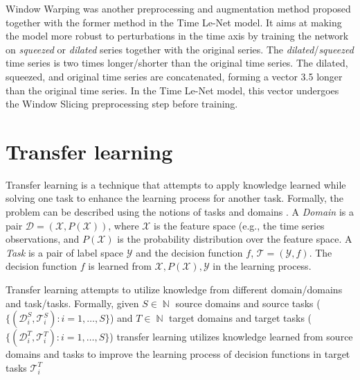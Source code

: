 \documentclass[a4paper,11pt,twoside]{report}
\theoremstyle{definition}
\DeclareMathOperator{\natur}{\mathbb{N}}
\begin{document}
Window Warping was another preprocessing and augmentation method proposed together with the former method in the Time Le-Net model. It aims at making the model more robust to perturbations in the time axis by training the network on \textit{squeezed} or \textit{dilated} series together with the original series. The \textit{dilated}/\textit{squeezed} time series is two times longer/shorter than the original time series.
The dilated, squeezed, and original time series are concatenated, forming a vector 3.5 longer than the original time series. In the Time Le-Net model, this vector undergoes the Window Slicing preprocessing step before training.



\section{Transfer learning}
Transfer learning is a technique that attempts to apply knowledge learned  while solving one task to enhance the learning process for another task. Formally, the problem can be described using the notions of tasks and domains \cite{survey_transfer_learning, comp_survey_transfer_leaerning}. A \textit{Domain} is a pair $\mathcal{D}=(\mathcal{X}, P(\mathcal{X}))$, where $\mathcal{X}$ is the feature space (e.g., the time series observations, and $P(\mathcal{X})$ is the probability distribution over the feature space. A \textit{Task} is a pair of label space $\mathcal{Y}$ and the decision function $f$, $\mathcal{T} = (\mathcal{Y}, f)$. The decision function $f$ is learned from $\mathcal{X}, P(\mathcal{X}), \mathcal{Y}$ in the learning process.

Transfer learning attempts to utilize knowledge from different domain/domains and task/tasks. Formally, given $S \in \natur$ source domains and source tasks ($\{(\mathcal{D}_i^S,\mathcal{T}_i^S): i=1, \dots, S \}$) and $T \in \natur$ target domains and target tasks ($\{(\mathcal{D}_i^T,\mathcal{T}_i^T): i=1, \dots, S \}$) transfer learning utilizes knowledge learned from source domains and tasks to improve the learning process of decision functions in target tasks $\mathcal{T}_i^T$
\end{document}
